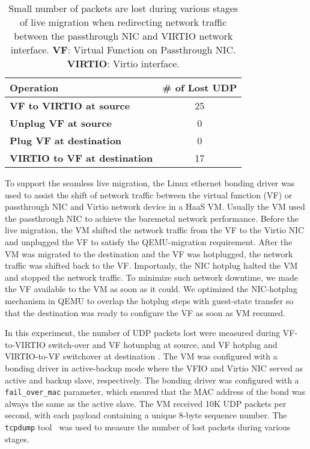 

\begin{table}[]
\begin{center}
\begin{tabular}{|l|c|}
\hline
\textbf{Operation}    & \multicolumn{1}{l|}{\textbf{\# of Lost UDP}} \\ \hline
\textbf{VF to VIRTIO at source} & 25                                           \\ \hline
\textbf{Unplug VF at source}    & 0                                            \\ \hline
\textbf{Plug VF at destination}      & 0                                            \\ \hline
\textbf{VIRTIO to VF at destination} & 17                                           \\ \hline
\end{tabular}
\end{center}
\caption{Small number of packets are lost during various stages of 
live migration when redirecting 
network traffic between the passthrough NIC and VIRTIO network
interface. \textbf{VF}: Virtual Function on Passthrough NIC. \textbf{VIRTIO}: Virtio interface.}
\label{tab:udp_packet_lost}
\end{table}

To support the seamless live migration, the Linux ethernet
bonding driver was used to assist the shift of network traffic
between the virtual function (VF) or passthrough NIC and
Virtio network device in a HaaS VM. Usually the VM used the
passthrough NIC to achieve the baremetal network performance.
Before the live migration, the VM shifted the network traffic
from the VF to the Virtio NIC and unplugged the VF to satisfy
the QEMU-migration requirement. After the VM was migrated to
the destination and the VF was hotplugged, the network traffic
was shifted back to the VF. Importanly, the NIC hotplug halted
the VM and stopped the network traffic. To minimize such
network downtime, we made the VF available to the VM as soon
as it could. We optimized the NIC-hotplug mechanism in QEMU
to overlap the hotplug steps with
guest-state transfer so that the destination was ready to
configure the VF as soon as VM resumed.

In this experiment, the number of UDP packets lost were measured
during VF-to-VIRTIO switch-over and VF hotunplug at source, and 
VF hotplug and VIRTIO-to-VF switchover at destination . The VM
was configured with a bonding driver in active-backup mode
where the VFIO and Virtio NIC served as active and backup
slave, respectively. The bonding driver was configured with a
\texttt{fail\_over\_mac} parameter, which ensured that the MAC
address of the bond was always the same as the active slave.
The VM received 10K UDP packets per second, with each payload
containing a unique 8-byte sequence number. 
The {\tt tcpdump} tool~\cite{tcpdump} was used to
measure the number of lost packets during various stages. 

